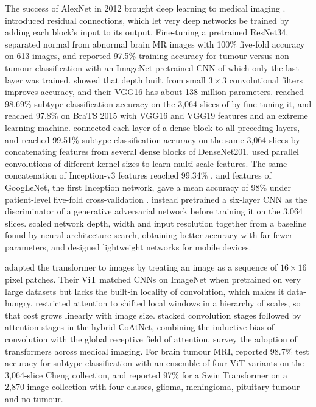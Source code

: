 \documentclass[a4paper,fleqn]{cas-sc}
\begin{document}
The success of AlexNet in 2012 \citep{krizhevsky2017} brought deep learning to medical imaging \citep{litjens2017}. \citet{he2016} introduced residual connections, which let very deep networks be trained by adding each block's input to its output. Fine-tuning a pretrained ResNet34, \citet{talo2019} separated normal from abnormal brain MR images with 100\% five-fold accuracy on 613 images, and \citet{seetha2018} reported 97.5\% training accuracy for tumour versus non-tumour classification with an ImageNet-pretrained CNN of which only the last layer was trained. \citet{simonyan2015} showed that depth built from small $3\times 3$ convolutional filters improves accuracy, and their VGG16 has about 138 million parameters. \citet{rehman2020} reached 98.69\% subtype classification accuracy on the 3,064 slices of \citet{cheng2015} by fine-tuning it, and \citet{khan2020} reached 97.8\% on BraTS 2015 with VGG16 and VGG19 features and an extreme learning machine. \citet{huang2017} connected each layer of a dense block to all preceding layers, and \citet{noreen2020} reached 99.51\% subtype classification accuracy on the same 3,064 slices by concatenating features from several dense blocks of DenseNet201. \citet{szegedy2016} used parallel convolutions of different kernel sizes to learn multi-scale features. The same concatenation of Inception-v3 features reached 99.34\% \citep{noreen2020}, and features of GoogLeNet, the first Inception network, gave a mean accuracy of 98\% under patient-level five-fold cross-validation \citep{deepak2019}. \citet{ghassemi2020} instead pretrained a six-layer CNN as the discriminator of a generative adversarial network before training it on the 3,064 slices. \citet{tan2019} scaled network depth, width and input resolution together from a baseline found by neural architecture search, obtaining better accuracy with far fewer parameters, and \citet{howard2019} designed lightweight networks for mobile devices.

\citet{dosovitskiy2021} adapted the transformer to images by treating an image as a sequence of $16\times 16$ pixel patches. Their ViT matched CNNs on ImageNet when pretrained on very large datasets but lacks the built-in locality of convolution, which makes it data-hungry. \citet{liu2021} restricted attention to shifted local windows in a hierarchy of scales, so that cost grows linearly with image size. \citet{dai2021} stacked convolution stages followed by attention stages in the hybrid CoAtNet, combining the inductive bias of convolution with the global receptive field of attention. \citet{shamshad2023} survey the adoption of transformers across medical imaging. For brain tumour MRI, \citet{tummala2022} reported 98.7\% test accuracy for subtype classification with an ensemble of four ViT variants on the 3,064-slice Cheng collection, and \citet{asiri2024} reported 97\% for a Swin Transformer on a 2,870-image collection with four classes, glioma, meningioma, pituitary tumour and no tumour.
\end{document}

